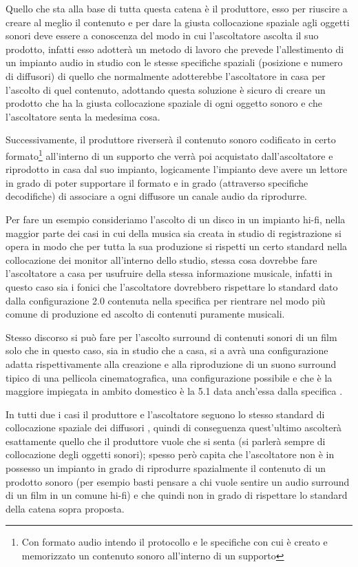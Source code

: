 \documentclass[12pt,a4paper]{report}
\begin{document}
Quello che sta alla base di tutta questa catena è il produttore, esso per riuscire a creare al meglio il contenuto e per dare la giusta collocazione spaziale agli oggetti sonori deve essere a conoscenza del modo in cui l'ascoltatore ascolta il suo prodotto, infatti esso adotterà un metodo di lavoro che prevede l'allestimento di un impianto audio in studio con le stesse specifiche spaziali (posizione e numero di diffusori) di quello che normalmente adotterebbe l'ascoltatore in casa per l'ascolto di quel contenuto, adottando questa soluzione è sicuro di creare un prodotto che ha la giusta collocazione spaziale di ogni oggetto sonoro e che l'ascoltatore senta la medesima cosa.

Successivamente, il produttore riverserà il contenuto sonoro codificato in certo formato\footnote{Con formato audio intendo il protocollo e le specifiche con cui è creato e memorizzato un contenuto sonoro all'interno di un supporto} all'interno di un supporto che verrà poi acquistato dall'ascoltatore e riprodotto in casa dal suo impianto, logicamente l'impianto deve avere un lettore in grado di poter supportare il formato e in grado (attraverso specifiche decodifiche) di associare a ogni diffusore un canale audio da riprodurre.

Per fare un esempio consideriamo l'ascolto di un disco in un impianto hi-fi, nella maggior parte dei casi in cui della musica sia creata in studio di registrazione si opera in modo che per tutta la sua produzione si rispetti un certo standard nella collocazione dei monitor all'interno dello studio, stessa cosa dovrebbe fare l'ascoltatore a casa per usufruire della stessa informazione musicale, infatti in questo caso sia i fonici che l'ascoltatore dovrebbero rispettare lo standard dato dalla configurazione 2.0 contenuta nella specifica \cite{5.1} per rientrare nel modo più comune di produzione ed ascolto di contenuti puramente musicali.

Stesso discorso si può fare per l'ascolto surround di contenuti sonori di un film solo che in questo caso, sia in studio che a casa, si a avrà una configurazione adatta rispettivamente alla creazione e alla riproduzione di un suono surround tipico di una pellicola cinematografica, una configurazione possibile e che è la maggiore impiegata in ambito domestico è la 5.1 data anch'essa dalla specifica \cite{5.1}.

In tutti due i casi il produttore e l'ascoltatore seguono lo stesso standard di collocazione spaziale dei diffusori , quindi di conseguenza quest'ultimo ascolterà esattamente quello che il produttore vuole che si senta (si parlerà sempre di collocazione degli oggetti sonori); spesso però capita che l'ascoltatore non è in possesso un impianto in grado di riprodurre spazialmente il contenuto di un prodotto sonoro (per esempio basti pensare a chi vuole sentire un audio surround di un film in un comune hi-fi) e che quindi non in grado di rispettare lo standard della catena sopra proposta.
\end{document}
